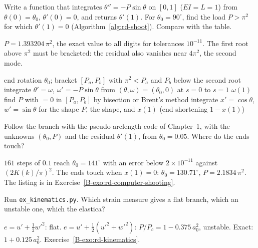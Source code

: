 \qc Write a function that integrates $\theta'' = -P\sin\theta$ on $[0,1]$ ($EI = L = 1$) from
$\theta(0) = \theta_0$, $\theta'(0) = 0$, and returns $\theta'(1)$. For $\theta_0 = 90^\circ$, find the load
$P > \pi^2$ for which $\theta'(1) = 0$ (Algorithm~\ref{alg:rd-shoot}). Compare with the table.
\begin{answer}
$P = 1.393204\,\pi^2$, the exact value to all digits for tolerances $10^{-11}$. The first root above
$\pi^2$ must be bracketed: the residual also vanishes near $4\pi^2$, the second mode.
\end{answer}

\begin{algorithm}[ht]
\caption{Shooting for the pinned elastica}\label{alg:rd-shoot}
\begin{algorithmic}[1]
\Require end rotation $\theta_0$; bracket $[P_a, P_b]$ with $\pi^2 < P_a$ and $P_b$ below the second root
  \State integrate $\theta' = \omega$, $\omega' = -P\sin\theta$ from $(\theta,\omega) = (\theta_0, 0)$ at $s = 0$ to $s = 1$
  \State \Return $\omega(1)$ 
\EndFunction
\State find $P$ with  $= 0$ in $[P_a, P_b]$ by bisection or Brent's method
\State integrate $x' = \cos\theta$, $w' = \sin\theta$ for the shape
\State \Return $P$, the shape, and $x(1)$ (end shortening $1 - x(1)$)
\end{algorithmic}
\end{algorithm}

\qc Follow the branch with the pseudo-arclength code of Chapter~1, with the unknowns
$(\theta_0, P)$ and the residual $\theta'(1)$, from $\theta_0 = 0.05$. Where do the ends touch?
\begin{answer}
$161$ steps of $0.1$ reach $\theta_0 = 141^\circ$ with an error below $2\times10^{-11}$ against
$(2K(k)/\pi)^2$. The ends touch when $x(1) = 0$: $\theta_0 = 130.71^\circ$, $P = 2.1834\,\pi^2$. The
listing is in Exercise~\ref{B-exo:rd-computer-shooting}.
\end{answer}

\qc Run \texttt{ex\_kinematics.py}. Which strain measure gives a flat branch, which an unstable one,
which the elastica?
\begin{answer}
$e = u' + \tfrac12w'^2$: flat. $e = u' + \tfrac12(u'^2 + w'^2)$: $P/P_c = 1 - 0.375\,a_0^2$, unstable.
Exact: $1 + 0.125\,a_0^2$. Exercise~\ref{B-exo:rd-kinematics}.
\end{answer}


